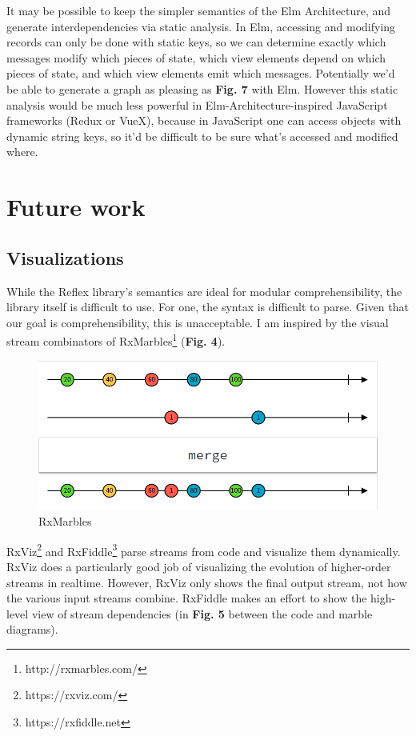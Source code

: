 \documentclass[sigconf]{acmart}
\begin{document}
It may be possible to keep the simpler semantics of the Elm Architecture, and generate interdependencies via static analysis. In Elm, accessing and modifying records can only be done with static keys, so we can determine exactly which messages modify which pieces of state, which view elements depend on which pieces of state, and which view elements emit which messages. Potentially we'd be able to generate a graph as pleasing as \textbf{Fig. 7} with Elm. However this static analysis would be much less powerful in Elm-Architecture-inspired JavaScript frameworks (Redux or VueX), because in JavaScript one can access objects with dynamic string keys, so it'd be difficult to be sure what's accessed and modified where.

\section{Future work}

\subsection{Visualizations}

While the Reflex library's semantics are ideal for modular comprehensibility, the library itself is difficult to use. For one, the syntax is difficult to parse. Given that our goal is comprehensibility, this is unacceptable. I am inspired by the visual stream combinators of RxMarbles\footnote{http://rxmarbles.com/} (\textbf{Fig. 4}).

\begin{figure}[h!]
\includegraphics[scale=0.2]{rxmarbles}
\caption{RxMarbles}
\label{fig:figure 4}
\end{figure}

RxViz\footnote{https://rxviz.com/} and RxFiddle\footnote{https://rxfiddle.net} parse streams from code and visualize them dynamically. RxViz does a particularly good job of visualizing the evolution of higher-order streams in realtime. However, RxViz only shows the final output stream, not how the various input streams combine. RxFiddle makes an effort to show the high-level view of stream dependencies (in \textbf{Fig. 5} between the code and marble diagrams).
\end{document}
